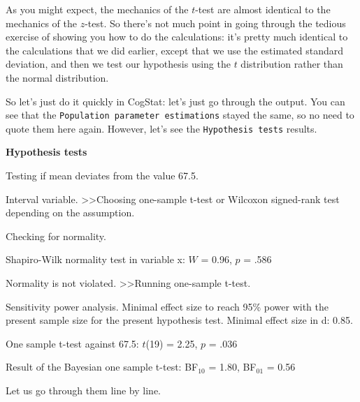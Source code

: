 \documentclass[
  11pt,
  a4paper,
  twoside,symmetric,openright]{book}
\theoremstyle{break}
\theoremstyle{break}
\begin{document}
As you might expect, the mechanics of the \(t\)-test are almost identical to the mechanics of the \(z\)-test. So there's not much point in going through the tedious exercise of showing you how to do the calculations: it's pretty much identical to the calculations that we did earlier, except that we use the estimated standard deviation, and then we test our hypothesis using the \(t\) distribution rather than the normal distribution.

So let's just do it quickly in CogStat: let's just go through the output. You can see that the \texttt{Population\ parameter\ estimations} stayed the same, so no need to quote them here again. However, let's see the \texttt{Hypothesis\ tests} results.

\begin{tcolorbox}[colback=white,
  colframe=lightgray,
  coltext=black,
  boxsep=4pt,
  boxrule=0.3pt,
  arc=0pt]
  {   \sffamily
      \color{CSblue}\textbf{Hypothesis tests}
      
      \color{CSgreen}Testing if mean deviates from the value 67.5.
      
      Interval variable. \textgreater\textgreater  Choosing one-sample t-test or Wilcoxon signed-rank test depending on the assumption.

      Checking for normality.

      \color{black}
      Shapiro-Wilk normality test in variable x: $W$ = 0.96, $p$ = .586

      \color{CSgreen}
      Normality is not violated. \textgreater\textgreater Running one-sample t-test.

      \color{black}
      Sensitivity power analysis. Minimal effect size to reach 95\% power with the present sample size for the present hypothesis test. Minimal effect size in d: 0.85.
      
      One sample t-test against 67.5: $t$(19) = 2.25, $p$ = .036

      Result of the Bayesian one sample t-test: BF$_{10}$ = 1.80, BF$_{01}$ = 0.56
      \normalfont
  }
\end{tcolorbox}

Let us go through them line by line.
\end{document}
